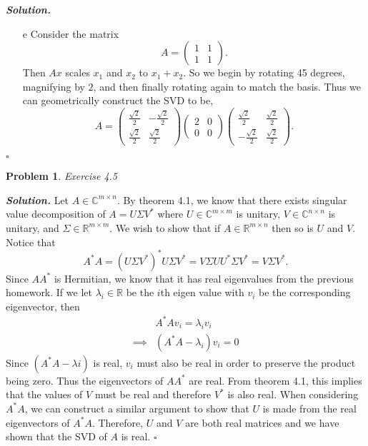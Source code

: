 \documentclass[12pt]{report}
\newtheorem{problem}{Problem}
\newenvironment{solution}[1][\it{Solution}]{\textbf{#1. } }{$\square$}
\def\C{{\mathbb C}}
\def\R{{\mathbb R}}
\begin{document}
\begin{solution}
\begin{enumerate}
        \item [e] Consider the matrix $$A = \begin{pmatrix} 1&1\\1&1 \end{pmatrix}.$$ Then $Ax$ scales $x_1$ and $x_2$ to $x_1 + x_2$. So we begin by rotating 45 degrees, magnifying by $2$, and then finally rotating again to match the basis. Thus we can geometrically construct the SVD to be, $$A = \begin{pmatrix} \frac{\sqrt{2}}{2}&-\frac{\sqrt{2}}{2}\\\frac{\sqrt{2}}{2}&\frac{\sqrt{2}}{2}\end{pmatrix}\begin{pmatrix} 2&0\\0&0\end{pmatrix}\begin{pmatrix} \frac{\sqrt{2}}{2}&\frac{\sqrt{2}}{2}\\-\frac{\sqrt{2}}{2}&\frac{\sqrt{2}}{2}\end{pmatrix}.$$
    \end{enumerate}
\end{solution}




\begin{problem}
    Exercise 4.5
\end{problem}

\begin{solution}
    \noindent
    Let $A \in \C^{m\times n}$. By theorem 4.1, we know that there exists  singular value decomposition of $A = U\Sigma V^*$ where $U \in \C^{m\times m}$ is unitary, $V \in \C^{n\times n}$ is unitary, and $\Sigma \in \R^{m\times m}$. We wish to show that if $A \in \R^{m\times n}$ then so is $U$ and $V$. Notice that
    $$A^*A = (U\Sigma V^*)^*U\Sigma V^* = V\Sigma U U^* \Sigma V^* = V \Sigma V^*.$$
    Since $AA^*$ is Hermitian, we know that it has real eigenvalues from the previous homework. If we let $\lambda_i \in \R$ be the $i$th eigen value with $v_i$ be the corresponding eigenvector, then
    \begin{align*}
        &A^*Av_i = \lambda_i v_i\\
        \implies &(A^*A - \lambda_i)v_i = 0  
    \end{align*} 
    Since $(A^*A - \lambda i)$ is real, $v_i$ must also be real in order to preserve the product being zero. Thus the eigenvectors of $AA^*$ are real. From theorem 4.1, this implies that the values of $V$ must be real and therefore $V^*$ is also real. When considering $A^*A$, we can construct a similar argument to show that $U$ is made from the real eigenvectors of $A^*A$. Therefore, $U$ and $V$ are both real matrices and we have shown that the SVD of $A$ is real.  
\end{solution}
\end{document}
